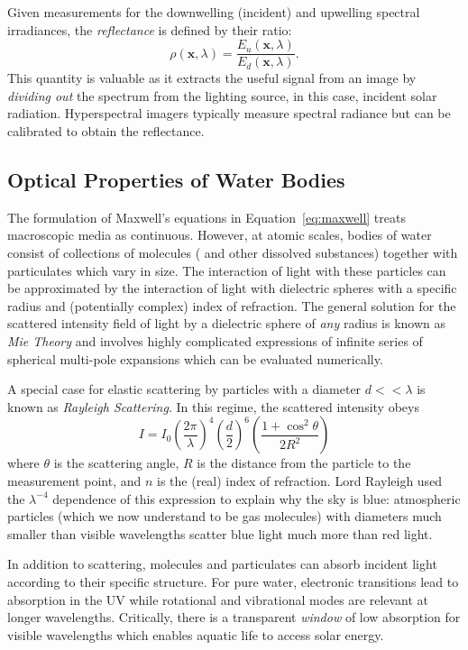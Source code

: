 Given measurements for the downwelling (incident) and upwelling spectral
irradiances, the \textit{reflectance} is defined by their ratio:
\begin{equation}
  \rho(\mathbf{x},\lambda) = \dfrac{E_u(\mathbf{x}, \lambda)}{E_d(\mathbf{x}, \lambda)}.
\end{equation}
This quantity is valuable as it extracts the useful signal from an image by
\textit{dividing out} the spectrum from the lighting source, in this case,
incident solar radiation. Hyperspectral imagers typically measure spectral
radiance but can be calibrated to obtain the reflectance.

\subsection{Optical Properties of Water Bodies}\label{sec:optical-properties-water}

The formulation of Maxwell's equations in Equation~\ref{eq:maxwell} treats
macroscopic media as continuous. However, at atomic scales, bodies of water
consist of collections of molecules ( and other dissolved substances)
together with particulates which vary in size. The interaction of light with
these particles can be approximated by the interaction of light with dielectric
spheres with a specific radius and (potentially complex) index of refraction.
The general solution for the scattered intensity field of light by a dielectric
sphere of \textit{any} radius is known as \textit{Mie Theory} and involves
highly complicated expressions of infinite series of spherical multi-pole
expansions which can be evaluated numerically.

A special case for elastic scattering by particles with a diameter $d <<
\lambda$ is known as \textit{Rayleigh Scattering}. In this regime, the scattered
intensity obeys
\begin{equation}
  I = I_0  \left( \frac{2\pi}{\lambda} \right)^4 \left( \frac{d}{2} \right)^6 \left( \frac{1 + \cos^2\theta}{2R^2} \right)
\end{equation}
where $\theta$ is the scattering angle, $R$ is the distance from the particle to
the measurement point, and $n$ is the (real) index of refraction. Lord Rayleigh
used the $\lambda^{-4}$ dependence of this expression to explain why the sky is
blue: atmospheric particles (which we now understand to be gas molecules) with
diameters much smaller than visible wavelengths scatter blue light
much more than red light.

In addition to scattering, molecules and particulates can absorb incident light
according to their specific structure. For pure water, electronic transitions
lead to absorption in the UV while rotational and vibrational modes are relevant
at longer wavelengths. Critically, there is a transparent \textit{window} of low
absorption for visible wavelengths which enables aquatic life to access solar
energy.

